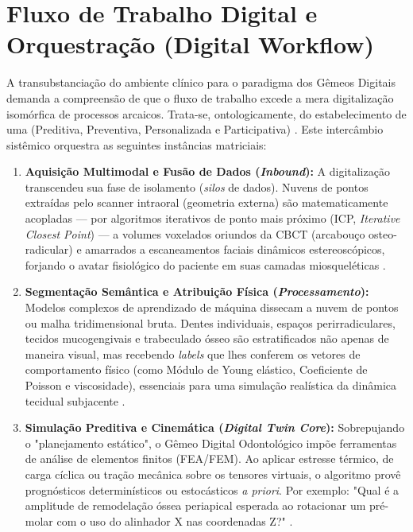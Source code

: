 \section{Fluxo de Trabalho Digital e Orquestração (Digital Workflow)}
\label{sec:workflow}

A transubstanciação do ambiente clínico para o paradigma dos Gêmeos Digitais demanda a compreensão de que o fluxo de trabalho excede a mera digitalização isomórfica de processos arcaicos. Trata-se, ontologicamente, do estabelecimento de uma  (Preditiva, Preventiva, Personalizada e Participativa) \cite{menon2026innovations}. Este intercâmbio sistêmico orquestra as seguintes instâncias matriciais:

\begin{enumerate}
    \item \textbf{Aquisição Multimodal e Fusão de Dados (\textit{Inbound}):} A digitalização transcendeu sua fase de isolamento (\textit{silos} de dados). Nuvens de pontos extraídas pelo scanner intraoral (geometria externa) são matematicamente acopladas — por algoritmos iterativos de ponto mais próximo (ICP, \textit{Iterative Closest Point}) — a volumes voxelados oriundos da CBCT (arcabouço osteo-radicular) e amarrados a escaneamentos faciais dinâmicos estereoscópicos, forjando o avatar fisiológico do paciente em suas camadas miosqueléticas \cite{katsoulakis2024digital}.
    
    \item \textbf{Segmentação Semântica e Atribuição Física (\textit{Processamento}):} Modelos complexos de aprendizado de máquina dissecam a nuvem de pontos ou malha tridimensional bruta. Dentes individuais, espaços perirradiculares, tecidos mucogengivais e trabeculado ósseo são estratificados não apenas de maneira visual, mas recebendo \textit{labels} que lhes conferem os vetores de comportamento físico (como Módulo de Young elástico, Coeficiente de Poisson e viscosidade), essenciais para uma simulação realística da dinâmica tecidual subjacente \cite{elsaid2025digital}.
    
    \item \textbf{Simulação Preditiva e Cinemática (\textit{Digital Twin Core}):} Sobrepujando o "planejamento estático", o Gêmeo Digital Odontológico impõe ferramentas de análise de elementos finitos (FEA/FEM). Ao aplicar estresse térmico, de carga cíclica ou tração mecânica sobre os tensores virtuais, o algoritmo provê prognósticos determinísticos ou estocásticos \textit{a priori}. Por exemplo: "Qual é a amplitude de remodelação óssea periapical esperada ao rotacionar um pré-molar com o uso do alinhador X nas coordenadas Z?" \cite{li2024aligner, bdj2026predictive}.
    

\end{enumerate}

